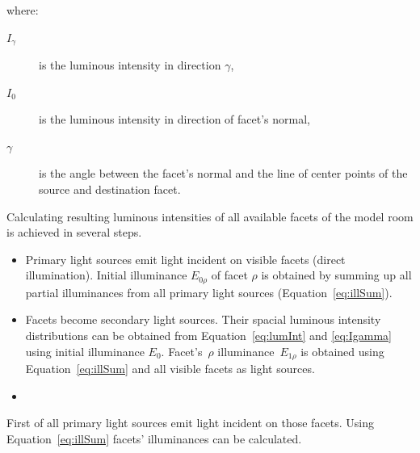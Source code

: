 where:
\begin{description}
	\item[$I_{\gamma}$] is the luminous intensity in direction $\gamma$,
	\item[$I_{0}$] is the luminous intensity in direction of facet's normal,
	\item[$\gamma$] is the angle between the facet's normal and the line of center points of the source and destination facet.
\end{description}

Calculating resulting luminous intensities of all available facets of the model room is achieved in several steps.

\begin{itemize}
	\item Primary light sources emit light incident on visible facets (direct illumination). Initial illuminance $E_{0\rho}$ of facet $\rho$ is obtained by summing up all partial illuminances from all primary light sources (Equation~\ref{eq:illSum}).
	\item Facets become secondary light sources. Their spacial luminous intensity distributions can be obtained from Equation~\ref{eq:lumInt} and \ref{eq:Igamma} using initial illuminance $E_{0}$. Facet's~$\rho$ illuminance~$E_{1\rho}$ is obtained using Equation~\ref{eq:illSum} and all visible facets as light sources.
	\item 
\end{itemize}

First of all primary light sources emit light incident on those facets. Using Equation~\ref{eq:illSum} facets' illuminances can be calculated. 
